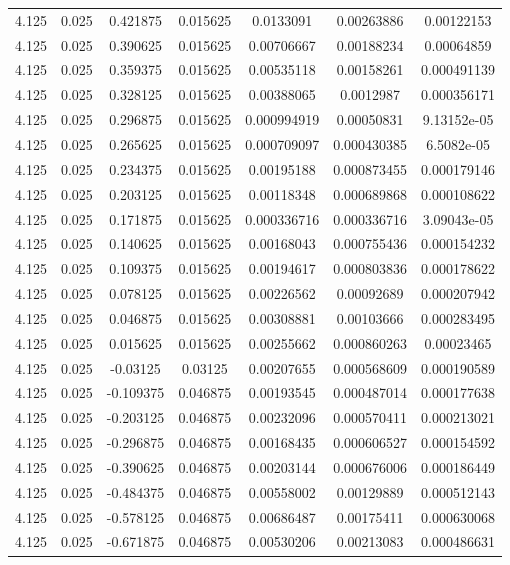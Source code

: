\begin{flushleft}
\begin{longtable}{ccccccc}
4.125 & 0.025 & 0.421875 & 0.015625 & 0.0133091 & 0.00263886 & 0.00122153  \\ 
4.125 & 0.025 & 0.390625 & 0.015625 & 0.00706667 & 0.00188234 & 0.00064859  \\ 
4.125 & 0.025 & 0.359375 & 0.015625 & 0.00535118 & 0.00158261 & 0.000491139  \\ 
4.125 & 0.025 & 0.328125 & 0.015625 & 0.00388065 & 0.0012987 & 0.000356171  \\ 
4.125 & 0.025 & 0.296875 & 0.015625 & 0.000994919 & 0.00050831 & 9.13152e-05  \\ 
4.125 & 0.025 & 0.265625 & 0.015625 & 0.000709097 & 0.000430385 & 6.5082e-05  \\ 
4.125 & 0.025 & 0.234375 & 0.015625 & 0.00195188 & 0.000873455 & 0.000179146  \\ 
4.125 & 0.025 & 0.203125 & 0.015625 & 0.00118348 & 0.000689868 & 0.000108622  \\ 
4.125 & 0.025 & 0.171875 & 0.015625 & 0.000336716 & 0.000336716 & 3.09043e-05  \\ 
4.125 & 0.025 & 0.140625 & 0.015625 & 0.00168043 & 0.000755436 & 0.000154232  \\ 
4.125 & 0.025 & 0.109375 & 0.015625 & 0.00194617 & 0.000803836 & 0.000178622  \\ 
4.125 & 0.025 & 0.078125 & 0.015625 & 0.00226562 & 0.00092689 & 0.000207942  \\ 
4.125 & 0.025 & 0.046875 & 0.015625 & 0.00308881 & 0.00103666 & 0.000283495  \\ 
4.125 & 0.025 & 0.015625 & 0.015625 & 0.00255662 & 0.000860263 & 0.00023465  \\ 
4.125 & 0.025 & -0.03125 & 0.03125 & 0.00207655 & 0.000568609 & 0.000190589  \\ 
4.125 & 0.025 & -0.109375 & 0.046875 & 0.00193545 & 0.000487014 & 0.000177638  \\ 
4.125 & 0.025 & -0.203125 & 0.046875 & 0.00232096 & 0.000570411 & 0.000213021  \\ 
4.125 & 0.025 & -0.296875 & 0.046875 & 0.00168435 & 0.000606527 & 0.000154592  \\ 
4.125 & 0.025 & -0.390625 & 0.046875 & 0.00203144 & 0.000676006 & 0.000186449  \\ 
4.125 & 0.025 & -0.484375 & 0.046875 & 0.00558002 & 0.00129889 & 0.000512143  \\ 
4.125 & 0.025 & -0.578125 & 0.046875 & 0.00686487 & 0.00175411 & 0.000630068  \\ 
4.125 & 0.025 & -0.671875 & 0.046875 & 0.00530206 & 0.00213083 & 0.000486631  \\ 

\end{longtable}
\end{flushleft}
